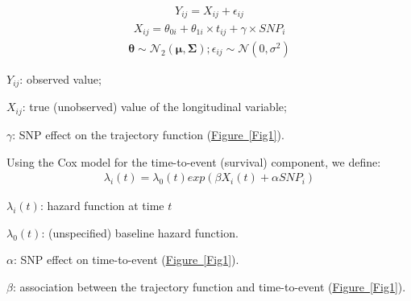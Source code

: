 \documentclass[10pt,a0,portrait]{a0poster}
\newcommand\bref[2]{\hyperref[#1]{#2~\ref*{#1}}}
\begin{document}
\begin{multicols}{2}
\begin{minipage}[t]{0.475\columnwidth}
\vspace{-1cm}%
\hspace{-10cm}
{\color{springgreen3}%
\begin{eqnarray}Y_{ij}=X_{ij}+\epsilon_{ij}\nonumber\label{Eq1}\end{eqnarray}
\begin{eqnarray}X_{ij}=\theta_{0i}+\theta_{1i}\times t_{ij}+\gamma \times SNP_i\nonumber\label{Eq2}\end{eqnarray}
\begin{eqnarray}\boldsymbol\theta \sim \mathcal{N}_2(\boldsymbol\mu, \boldsymbol\Sigma)\nonumber\label{Eq3}; \epsilon_{ij} \sim \mathcal{N}(0, \sigma^2)\nonumber\label{Eq4}\end{eqnarray}
}%
\vspace{-1cm}
\end{minipage}%
\hfill\vline\hfill
\begin{minipage}[t]{0.475\columnwidth}%
\vspace{0.8cm}%
\par{{\color{springgreen3}$Y_{ij}$}: observed value;}
\vspace{0.25cm}%
\par{{\color{springgreen3}$X_{ij}$}: true (unobserved) value of the longitudinal variable;}
\vspace{0.25cm}%
\par{{\color{springgreen3}$\gamma$}: SNP effect on the trajectory function (\bref{Fig1}{Figure}).}
\end{minipage}
\vspace{3cm}
\par{Using the Cox model for the time-to-event (survival) component, we define:}
{\color{springgreen3}\begin{eqnarray}\lambda_i(t)=\lambda_0(t) exp(\beta X_i(t)+\alpha SNP_i)\nonumber\label{Eq5}\end{eqnarray}}
\begin{minipage}[t]{0.475\columnwidth}
\vspace{0.10cm}%
\par{{\color{springgreen3}$\lambda_i(t)$}: hazard function at time {\color{springgreen3}$t$}}
\vspace{1.85cm}%
\par{{\color{springgreen3}$\lambda_0(t)$}: (unspecified) baseline hazard function.}
\end{minipage}%
\hfill\vline\hfill
\begin{minipage}[t]{0.475\columnwidth}%
\vspace{0.10cm}%
\par{{\color{springgreen3}$\alpha$}: SNP effect on time-to-event (\bref{Fig1}{Figure}).}
\par{{\color{springgreen3}$\beta$}: association between the trajectory function and time-to-event (\bref{Fig1}{Figure}).}
\end{minipage}



\end{multicols}
\end{document}
